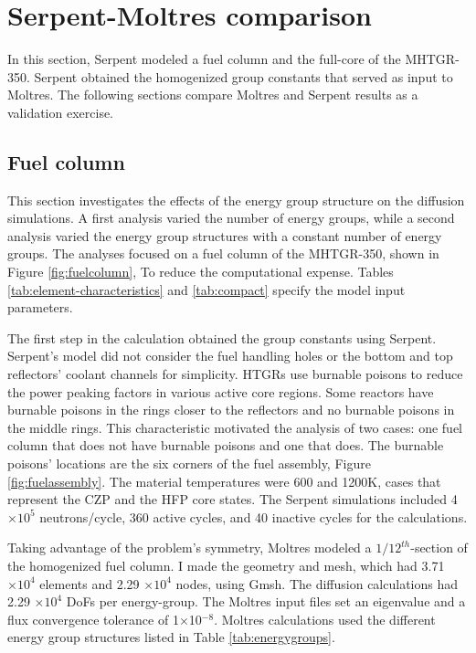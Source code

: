 \section{Serpent-Moltres comparison}
\label{sec:neut-serpent}

In this section, Serpent modeled a fuel column and the full-core of the MHTGR-350.
Serpent obtained the homogenized group constants that served as input to Moltres.
The following sections compare Moltres and Serpent results as a validation exercise.

\subsection{Fuel column}
\label{sec:neut-fuelcol}

This section investigates the effects of the energy group structure on the diffusion simulations.
A first analysis varied the number of energy groups, while a second analysis varied the energy group structures with a constant number of energy groups.
The analyses focused on a fuel column of the MHTGR-350, shown in Figure \ref{fig:fuelcolumn}, To reduce the computational expense.
Tables \ref{tab:element-characteristics} and \ref{tab:compact} specify the model input parameters.

The first step in the calculation obtained the group constants using Serpent.
Serpent's model did not consider the fuel handling holes or the bottom and top reflectors' coolant channels for simplicity.
HTGRs use burnable poisons to reduce the power peaking factors in various active core regions.
Some reactors have burnable poisons in the rings closer to the reflectors and no burnable poisons in the middle rings.
This characteristic motivated the analysis of two cases: one fuel column that does not have burnable poisons and one that does.
The burnable poisons' locations are the six corners of the fuel assembly, Figure \ref{fig:fuelassembly}.
The material temperatures were 600 and 1200K, cases that represent the \gls{CZP} and the \gls{HFP} core states.
The Serpent simulations included 4$\times 10^5$ neutrons/cycle, 360 active cycles, and 40 inactive cycles for the calculations.

Taking advantage of the problem's symmetry, Moltres modeled a $1/12^{th}$-section of the homogenized fuel column.
I made the geometry and mesh, which had 3.71 $\times 10^4$ elements and 2.29 $\times 10^4$ nodes, using Gmsh.
The diffusion calculations had 2.29 $\times 10^4$ \glspl{DoF} per energy-group.
The Moltres input files set an eigenvalue and a flux convergence tolerance of 1$\times$10$^{-8}$.
Moltres calculations used the different energy group structures listed in Table \ref{tab:energygroups}.

